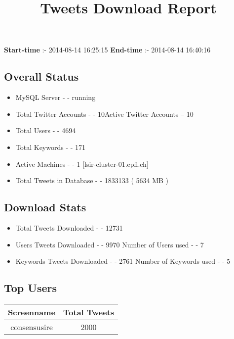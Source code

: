 \documentclass{article}\usepackage[T1]{fontenc}
\begin{document}
\title{\textbf{Tweets Download Report}}
               \date{}
                \maketitle
               \centerline{\textbf{Start-time} :- 2014-08-14 16:25:15 \hspace{40pt} \textbf{End-time} :- 2014-08-14 16:40:16}               \subsection*{Overall Status}                \begin{itemize}                \item MySQL Server - - running               \item Total Twitter Accounts - - 10\newline Active Twitter Accounts -- 10               \item Total Users - - 4694               \item Total Keywords - - 171               \item Active Machines - - 1 [lsir-cluster-01.epfl.ch]               \item Total Tweets in Database - - 1833133 ( 5634 MB )               \end{itemize}               \subsection*{Download Stats}                \begin{itemize}                \item Total Tweets Downloaded - - 12731               \item Users Tweets Downloaded - - 9970 \newline Number of Users used - - 7               \item Keywords Tweets Downloaded - - 2761 \newline Number of Keywords used - - 5              \end{itemize}              \subsection*{Top Users}\begin{tabular}{|c|c|}         \hline         Screenname & Total Tweets \\ 
 \hline
consensusire & 2000\\ 
 \hline

\end{tabular}
\end{document}
